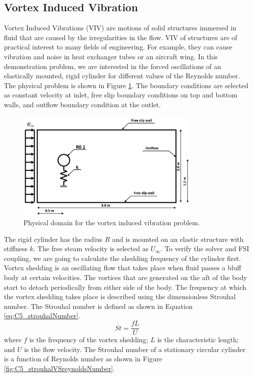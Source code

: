 \subsection{Vortex Induced Vibration}
Vortex Induced Vibrations (VIV) are motions of solid structures immersed in fluid that are caused by the irregularities in the flow. VIV of structures are of practical interest to many fields of engineering. For example, they can cause vibration and noise in heat exchanger tubes or an aircraft wing. In this demonstration problem, we are interested in the forced oscillations of an elastically mounted, rigid cylinder for different values of the Reynolds number. The physical problem is shown in Figure \ref{fig:C5_cylinderShape}. The boundary conditions are selected as constant velocity at inlet, free slip boundary conditions on top and bottom walls, and outflow boundary condition at the outlet.
%
\begin{figure}[H]
    \centering
    \includegraphics[width=9.00cm]{Chapter_5/figure/VIV_domain_shape.jpg}
    \caption{Physical domain for the vortex induced vibration problem.}
    \label{fig:C5_cylinderShape}
\end{figure}
%
The rigid cylinder has the radius $R$ and is mounted on an elastic structure with stiffness $k$. The free steam velocity is selected as $U_\infty$. To verify the solver and FSI coupling, we are going to calculate the shedding frequency of the cylinder first. Vortex shedding is an oscillating flow that takes place when fluid passes a bluff body at certain velocities. The vortices that are generated on the aft of the body start to detach periodically from either side of the body. The frequency at which the vortex shedding takes place is described using the dimensionless Strouhal number. The Strouhal number is defined as shown in Equation \eqref{eq:C5_strouhalNumber}.
%
\begin{equation}\label{eq:C5_strouhalNumber}
	St = \frac{fL}{U}
\end{equation}
%
where $f$ is the frequency of the vortex shedding; $L$ is the characteristic length; and $U$ is the flow velocity. The Strouhal number of a stationary circular cylinder is a function of Reynolds number \cite{chen1987flow} as shown in Figure \ref{fig:C5_strouhalVSreynoldsNumber}\cite{jendrzejczyk1985fluid}.
